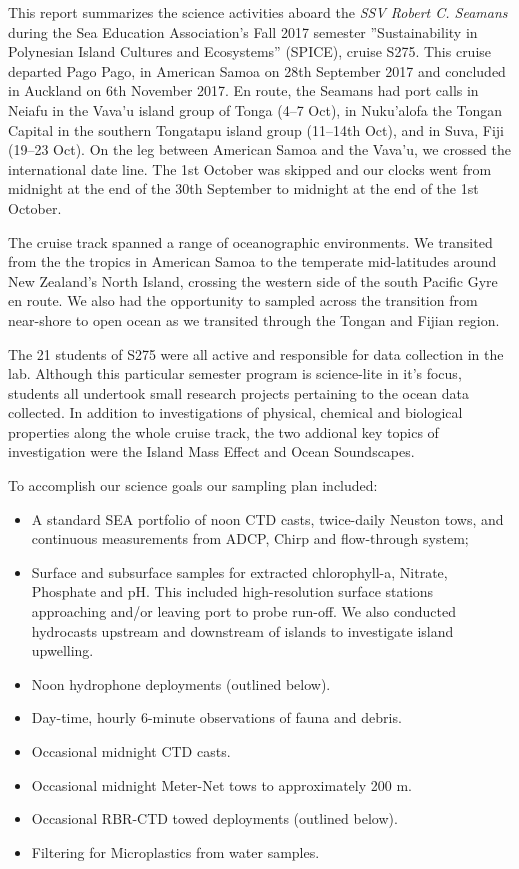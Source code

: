 \documentclass[letterpaper,11pt]{article}
\begin{document}
This report summarizes the science activities aboard the \textit{SSV Robert C. Seamans} during the Sea Education Association's Fall 2017 semester ''Sustainability in Polynesian Island Cultures and Ecosystems'' (SPICE), cruise S275. This cruise departed Pago Pago, in American Samoa on 28th September 2017 and concluded in Auckland on 6th November 2017. En route, the Seamans had port calls in Neiafu in the Vava'u island group of Tonga (4--7 Oct), in Nuku'alofa the Tongan Capital in the southern Tongatapu island group (11--14th Oct), and in Suva, Fiji (19--23 Oct). On the leg between American Samoa and the Vava'u, we crossed the international date line. The 1st October was skipped and our clocks went from midnight at the end of the 30th September to midnight at the end of the 1st October.

The cruise track spanned a range of oceanographic environments. We transited from the the tropics in American Samoa to the temperate mid-latitudes around New Zealand's North Island, crossing the western side of the south Pacific Gyre en route. We also had the opportunity to sampled across the transition from near-shore to open ocean as we transited through the Tongan and Fijian region.

The 21 students of S275 were all active and responsible for data collection in the lab. Although this particular semester program is science-lite in it's focus, students all undertook small research projects pertaining to the ocean data collected. In addition to investigations of physical, chemical and biological properties along the whole cruise track, the two addional key topics of investigation were the Island Mass Effect and Ocean Soundscapes.

To accomplish our science goals our sampling plan included:

\begin{itemize}
  \item A standard SEA portfolio of noon CTD casts, twice-daily Neuston tows, and continuous measurements from ADCP, Chirp and flow-through system;
 \item Surface and subsurface samples for extracted chlorophyll-a, Nitrate, Phosphate and pH. This included high-resolution surface stations approaching and/or leaving port to probe run-off. We also conducted hydrocasts upstream and downstream of islands to investigate island upwelling.
 \item Noon hydrophone deployments (outlined below).
 \item Day-time, hourly 6-minute observations of fauna and debris.
 \item Occasional midnight CTD casts.
 \item Occasional midnight Meter-Net tows to approximately 200 m.
 \item Occasional RBR-CTD towed deployments (outlined below).
 \item Filtering for Microplastics from water samples.
\end{itemize} 
\end{document}
